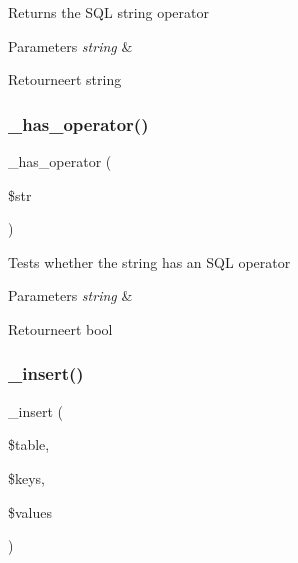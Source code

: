 Returns the S\+QL string operator


\begin{DoxyParams}{Parameters}
{\em string} & \\
\hline
\end{DoxyParams}
\begin{DoxyReturn}{Retourneert}
string 
\end{DoxyReturn}
\mbox{\label{class_c_i___d_b__driver_a2e0ab20a3cd2941eaa854fe0b4a81e6b}} 
\subsubsection{\texorpdfstring{\_has\_operator()}{\_has\_operator()}}
{\footnotesize\ttfamily \+\_\+has\+\_\+operator (\begin{DoxyParamCaption}\item[{}]{\$str }\end{DoxyParamCaption})\hspace{0.3cm}{\ttfamily [protected]}}

Tests whether the string has an S\+QL operator


\begin{DoxyParams}{Parameters}
{\em string} & \\
\hline
\end{DoxyParams}
\begin{DoxyReturn}{Retourneert}
bool 
\end{DoxyReturn}
\mbox{\label{class_c_i___d_b__driver_a69ee76b136052e0a8f06097fb388e53e}} 
\subsubsection{\texorpdfstring{\_insert()}{\_insert()}}
{\footnotesize\ttfamily \+\_\+insert (\begin{DoxyParamCaption}\item[{}]{\$table,  }\item[{}]{\$keys,  }\item[{}]{\$values }\end{DoxyParamCaption})\hspace{0.3cm}{\ttfamily [protected]}}

